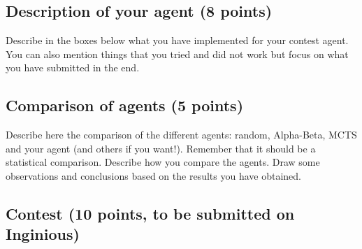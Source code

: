 \documentclass[11pt,a4paper]{report}
\begin{document}
\newpage
\subsection{Description of your agent (8 points)}
Describe in the boxes below what you have implemented for your contest agent. You can also mention things that you tried and did not work but focus on what you have submitted in the end.

\begin{answers}[21cm]
\end{answers}

\begin{answers}[23cm]
\end{answers}

\begin{answers}[23cm]
\end{answers}



\newpage
\subsection{Comparison of agents (5 points)}
Describe here the comparison of the different agents: random, Alpha-Beta, MCTS and your agent (and others if you want!). Remember that it should be a statistical comparison. Describe how you compare the agents. Draw some observations and conclusions based on the results you have obtained.

\begin{answers}[20cm]
\end{answers}

\begin{answers}[23cm]
\end{answers}

\begin{answers}[23cm]
\end{answers}


\subsection{Contest (10 points, to be submitted on Inginious)}
\end{document}

